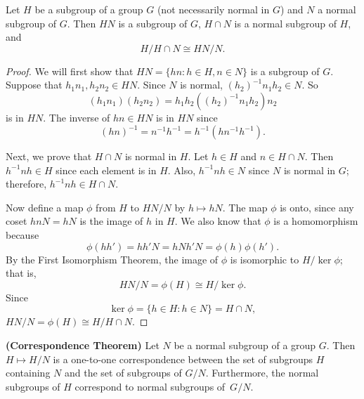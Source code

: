  
\begin{theorem}
Let  $H$ be a subgroup of a group $G$ (not necessarily normal in $G$)
and $N$ a normal subgroup of $G$.  Then $HN$ is a subgroup of $G$,
$H \cap N$ is a normal subgroup of $H$, and 
$$
H / H \cap N \cong HN /N.
$$
\end{theorem}
 
 
\begin{proof}
We will first show that $HN = \{ hn : h \in H, n \in N \}$ is a
subgroup of $G$.  Suppose that  $h_1 n_1, h_2 n_2 \in HN$. Since 
$N$ is normal, $(h_2)^{-1} n_1 h_2 \in N$. So 
$$
(h_1 n_1)(h_2 n_2) = h_1 h_2 ( (h_2)^{-1} n_1 h_2 )n_2
$$
is in $HN$. The inverse of $hn \in HN$ is in $HN$ since
$$
( hn )^{-1} = n^{-1 } h^{-1} = h^{-1} (h n^{-1} h^{-1} ).
$$
 
 
Next, we prove that $H \cap N$ is normal in $H$. Let $h \in H$ and $n
\in H \cap N$. Then $h^{-1} n h \in H$ since each element is in $H$.
Also, $h^{-1} n h \in N$ since $N$ is normal in $G$; therefore,
$h^{-1} n h \in H \cap N$. 
 
 
Now define a map $\phi$ from $H$ to $ HN / N$ by $h \mapsto h N$. The
map $\phi$ is onto, since any coset $h n N = h N$ is the image of $h$
in $H$. We also know that $\phi$ is a homomorphism because 
$$
\phi( h  h')  = h h' N =  h N h' N =  \phi( h ) \phi( h').
$$
By the First Isomorphism Theorem, the image of $\phi$ is isomorphic to
$H / \ker \phi$; that is,
$$
HN/N = \phi(H) \cong H / \ker \phi.
$$
Since
$$
\ker \phi = \{ h \in H : h \in N \} = H \cap N,
$$
$HN/N = \phi(H) \cong H / H \cap N$.
\end{proof}
 
 
\begin{theorem} {\bf (Correspondence Theorem)}
Let $N$ be a normal subgroup of a group $G$. Then $H \mapsto H/N$
is a one-to-one correspondence between the set of subgroups $H$
containing $N$  and the set of subgroups of $G/N$. Furthermore, the
normal subgroups of $H$ correspond to normal subgroups of~$G/N$. 
\end{theorem}
 
